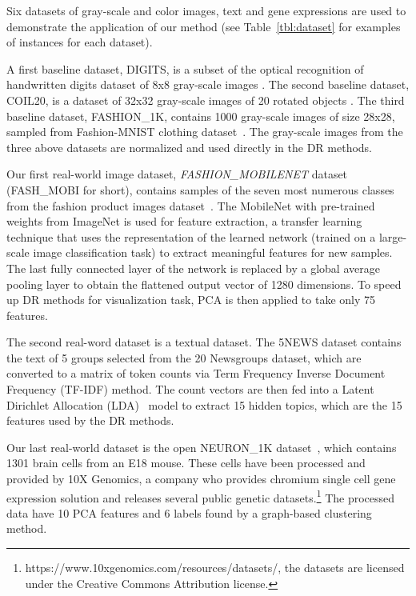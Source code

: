 Six datasets of gray-scale and color images, text and gene expressions are used to demonstrate the application of our method (see Table~\ref{tbl:dataset} for examples of instances for each dataset).

A first baseline dataset, DIGITS, is a subset of the optical recognition of handwritten digits dataset of 8x8 gray-scale images \cite{kaynak1995methods}.
The second baseline dataset, COIL20, is a dataset of 32x32 gray-scale images of 20 rotated objects  \cite{nene1996}.
The third baseline dataset, {FASHION\_1K}, contains 1000 gray-scale images of size 28x28, sampled from Fashion-MNIST clothing dataset~\cite{xiao2017/online}.
The gray-scale images from the three above datasets are normalized and used directly in the DR methods.

Our first real-world image dataset, \emph{FASHION\_MOBILENET} dataset ({FASH\_MOBI} for short), contains samples of the seven most numerous classes from the fashion product images dataset~\cite{fashionproduct}.
The MobileNet\cite{howard2017mobilenets} with pre-trained weights from ImageNet is used for feature extraction, a transfer learning technique that uses the representation of the learned network (trained on a large-scale image classification task) to extract meaningful features for new samples.
The last fully connected layer of the network is replaced by a global average pooling layer \cite{lin2013network} to obtain the flattened output vector of 1280 dimensions.
To speed up DR methods for visualization task, PCA is then applied to take only 75 features.

The second real-word dataset is a textual dataset. The 5NEWS dataset contains the text of 5 groups selected from the 20 Newsgroups dataset, which are converted to a matrix of token counts via Term Frequency Inverse Document Frequency (TF-IDF) method.
The count vectors are then fed into a Latent Dirichlet Allocation (LDA)~\cite{blei2003latent} model to extract 15 hidden topics, which are the 15 features used by the DR methods.

Our last real-world dataset is the open {NEURON\_1K} dataset~\cite{neuron1k}, which contains 1301 brain cells from an E18 mouse. These cells have been processed and provided by 10X Genomics, a company who provides chromium single cell gene expression solution and releases several public genetic datasets.\footnote{https://www.10xgenomics.com/resources/datasets/, the datasets are licensed under the Creative Commons Attribution license.}
The processed data have 10 PCA features and 6 labels found by a graph-based clustering method.


